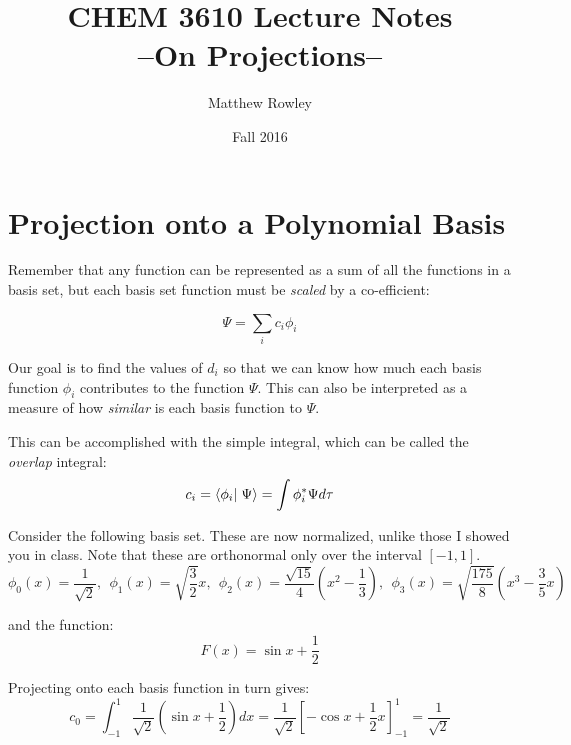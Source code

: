 \documentclass[12pt, openany, letterpaper]{memoir}
\begin{document}
\title{CHEM 3610 Lecture Notes\\--On Projections--}
\author{Matthew Rowley}
\date{Fall 2016}
\mainmatter
\maketitle
\section*{Projection onto a Polynomial Basis}

Remember that any function can be represented as a sum of all the functions in a basis set, but each basis set function must be \emph{scaled} by a co-efficient:

\begin{equation*}
	\Psi = \sum_i{c_i \phi_i}
\end{equation*}

Our goal is to find the values of $d_i$ so that we can know how much each basis function $\phi_i$ contributes to the function $\Psi$. This can also be interpreted as a measure of how \emph{similar} is each basis function to $\Psi$.

\vspace{1em}
This can be accomplished with the simple integral, which can be called the \emph{overlap} integral:
\begin{equation*}
	c_i = \braket{\phi_i}{\Psi} = \int{\phi_i^*\Psi d\tau}
\end{equation*}

\vspace{1em}
Consider the following basis set. These are now normalized, unlike those I showed you in class. Note that these are orthonormal only over the interval $[-1,1]$. 
\begin{equation*}
	\phi_0(x) = \frac{1}{\sqrt{2}}, ~~ \phi_1(x) = \sqrt{\frac{3}{2}}x, ~~ \phi_2(x) = \frac{\sqrt{15}}{4}\left(x^2-\frac{1}{3}\right), ~~ \phi_3(x) = \sqrt{\frac{175}{8}}\left(x^3 -\frac{3}{5}x\right)
\end{equation*}

and the function:
\begin{equation*}
	F(x) = \sin{x}+\frac{1}{2}
\end{equation*}

Projecting onto each basis function in turn gives:
\begin{equation*}
	c_0 = \int_{-1}^{1}\frac{1}{\sqrt{2}}\left(\sin{x}+\frac{1}{2}\right)dx = \frac{1}{\sqrt{2}}\left[-\cos{x}+\frac{1}{2}x\right]_{-1}^{1} = \frac{1}{\sqrt{2}}
\end{equation*}
\end{document}
